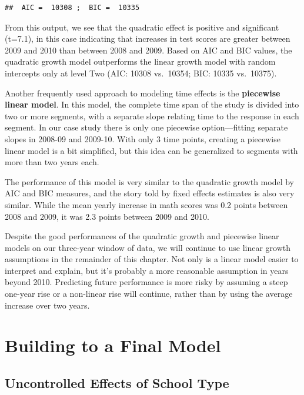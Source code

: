 \documentclass[
]{krantz}
\begin{document}
\begin{verbatim}
##  AIC =  10308 ;  BIC =  10335
\end{verbatim}

From this output, we see that the quadratic effect is positive and significant (t=7.1), in this case indicating that increases in test scores are greater between 2009 and 2010 than between 2008 and 2009. Based on AIC and BIC values, the quadratic growth model outperforms the linear growth model with random intercepts only at level Two (AIC: 10308 vs.~10354; BIC: 10335 vs.~10375).

Another frequently used approach to modeling time effects is the \textbf{piecewise linear model}. In this model, the complete time span of the study is divided into two or more segments, with a separate slope relating time to the response in each segment. In our case study there is only one piecewise option---fitting separate slopes in 2008-09 and 2009-10. With only 3 time points, creating a piecewise linear model is a bit simplified, but this idea can be generalized to segments with more than two years each.

The performance of this model is very similar to the quadratic growth model by AIC and BIC measures, and the story told by fixed effects estimates is also very similar. While the mean yearly increase in math scores was 0.2 points between 2008 and 2009, it was 2.3 points between 2009 and 2010.

Despite the good performances of the quadratic growth and piecewise linear models on our three-year window of data, we will continue to use linear growth assumptions in the remainder of this chapter. Not only is a linear model easier to interpret and explain, but it's probably a more reasonable assumption in years beyond 2010. Predicting future performance is more risky by assuming a steep one-year rise or a non-linear rise will continue, rather than by using the average increase over two years.

\hypertarget{finalmodel}{%
\section{Building to a Final Model}\label{finalmodel}}

\hypertarget{sec:modelc9}{%
\subsection{Uncontrolled Effects of School Type}\label{sec:modelc9}}
\end{document}
